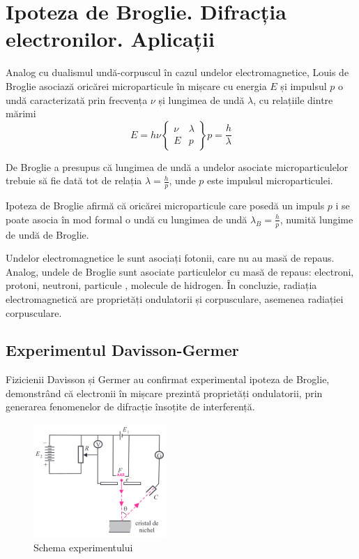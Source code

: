 \section{Ipoteza de Broglie. Difracția electronilor. Aplicații}

Analog cu dualismul undă-corpuscul în cazul undelor electromagnetice, Louis de Broglie asociază oricărei microparticule în mișcare cu energia $E$ și impulsul $p$ o undă caracterizată prin frecvența $\nu$ și lungimea de undă $\lambda$, cu relațiile dintre mărimi
\[
    E = h \nu
    \begin{Bmatrix}
        \nu & \lambda \\
        E   & p
    \end{Bmatrix}
    p = \frac{h}{\lambda}
\]

De Broglie a presupus că lungimea de undă a undelor asociate microparticulelor
trebuie să fie dată tot de relația \( \lambda = \frac{h}{p} \), unde $p$ este
impulsul microparticulei.

\parbreak

Ipoteza de Broglie afirmă că oricărei microparticule care posedă un impuls $p$
i se poate asocia în mod formal o undă cu lungimea de undă
\( \lambda_B = \frac{h}{p} \), numită lungime de undă de Broglie.

Undelor electromagnetice le sunt asociați fotonii, care nu au masă de repaus.
Analog, undele de Broglie sunt asociate particulelor cu masă de repaus:
electroni, protoni, neutroni, particule \alpha, molecule de hidrogen. În
concluzie, radiația electromagnetică are proprietăți ondulatorii și
corpusculare, asemenea radiației corpusculare.

\subsection*{Experimentul Davisson-Germer}

Fizicienii Davisson și Germer au confirmat experimental ipoteza de Broglie,
demonstrând că electronii în mișcare prezintă proprietăți ondulatorii, prin
generarea fenomenelor de difracție însoțite de interferență.

\begin{figure}
    \includegraphics[width=0.45\textwidth]{fig/davisson_germer}
    \caption{Schema experimentului}
\end{figure}

